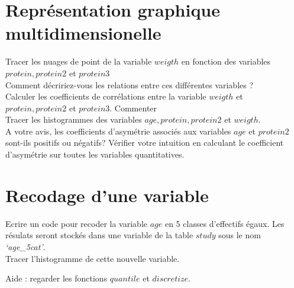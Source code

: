 \documentclass[11pt]{exam}
\begin{document}
\section{Repr\'esentation graphique multidimensionelle}
Tracer les nuages de point de la variable $weigth$ en fonction des variables $protein,protein2$ et $protein3$\\
Comment d\'ecririez-vous les relations entre ces diff\'erentes variables ?\\
Calculer les coefficients de corr\'elations entre la variable $weigth$ et $protein,protein2$ et $protein3$. Commenter\\
Tracer les histogrammes des variables $age,protein, protein2$ et $weigth$.\\
A votre avis, les coefficients d'asym\'etrie  associ\'es aux variables $age$ et $protein2$ sont-ils positifs ou n\'egatifs? V\'erifier votre intuition en calculant le coefficient d'asym\'etrie sur toutes les variables quantitatives.\\

\section{Recodage d'une variable}
Ecrire un code pour recoder la variable $age$ en 5 classes d'effectifs \'egaux. Les r\'esulats seront stock\'es dans une variable de la table $study$ sous le nom  \textit{`age\_5cat'}.\\
Tracer l'histogramme de cette nouvelle variable.

Aide : regarder les fonctions $quantile$ et $discretize$.
\end{document}
